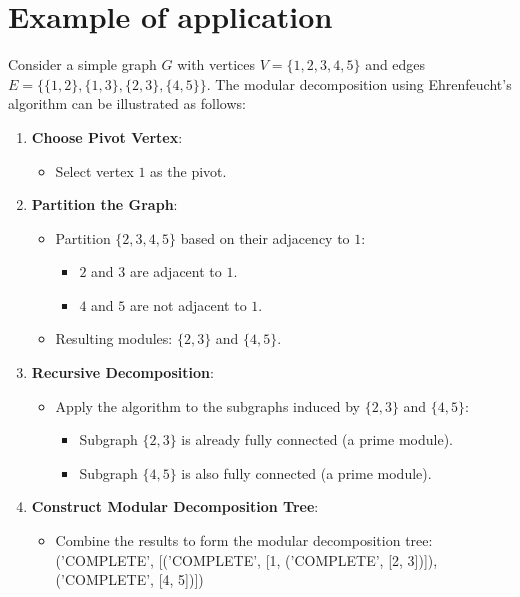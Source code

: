 \section{Example of application}\label{sec:example-of-application}

Consider a simple graph $G$ with vertices $V = \{1, 2, 3, 4, 5\}$ and edges $E = \{\{1, 2\}, \{1, 3\}, \{2, 3\}, \{4, 5\}\}$.
The modular decomposition using Ehrenfeucht's algorithm can be illustrated as follows:

\begin{enumerate}
    \item \textbf{Choose Pivot Vertex}:
            \begin{itemize}
                \item Select vertex $1$ as the pivot.
            \end{itemize}
    \item \textbf{Partition the Graph}:
            \begin{itemize}
                \item Partition $\{2, 3, 4, 5\}$ based on their adjacency to $1$:
                        \begin{itemize}
                            \item $2$ and $3$ are adjacent to $1$.
                            \item $4$ and $5$ are not adjacent to $1$.
                        \end{itemize}
                \item Resulting modules: $\{2, 3\}$ and $\{4, 5\}$.
            \end{itemize}
    \item \textbf{Recursive Decomposition}:
            \begin{itemize}
                \item Apply the algorithm to the subgraphs induced by $\{2, 3\}$ and $\{4, 5\}$:
                        \begin{itemize}
                            \item Subgraph $\{2, 3\}$ is already fully connected (a prime module).
                            \item Subgraph $\{4, 5\}$ is also fully connected (a prime module).
                        \end{itemize}
            \end{itemize}
    \item \textbf{Construct Modular Decomposition Tree}:
            \begin{itemize}
                \item Combine the results to form the modular decomposition tree: ('COMPLETE', [('COMPLETE', [1, ('COMPLETE', [2, 3])]), ('COMPLETE', [4, 5])])
            \end{itemize}
\end{enumerate}


